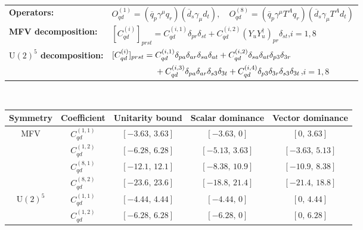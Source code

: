 \begin{table}[tbp]
\centering
{\small
\begin{tabular}{ll}
    \textbf{Operators:} &
        $\boxed{O_{qd}^{(1)} = (\overline q_p \gamma^\mu q_r)(\overline d_s \gamma_\mu d_t),\quad O_{qd}^{(8)} = (\overline q_p \gamma^\mu T^A q_r)(\overline d_s \gamma_\mu T^A d_t)}$ \\[0.2cm]
    \textbf{MFV decomposition:} &
        $[C_{qd}^{(i)}]_{prst} =
            C_{qd}^{(i,1)}\delta_{pr}\delta_{st}
            + C_{qd}^{(i,2)}(Y_u Y_u^\dagger)_{pr}\delta_{st}$,\quad $i=1,8$ \\[0.15cm]
    \textbf{$\mathrm{U}(2)^5$ decomposition:} &
        $[C_{qd}^{(i)}]_{prst} =
            C_{qd}^{(i,1)}\Pij{p}{r}{a}\Pij{s}{t}{a}
            + C_{qd}^{(i,2)}\Pij{s}{t}{a}\delta_{p3}\delta_{3r}$ \\
        & $\phantom{[C_{qd}^{(i)}]_{prst} ={}}+ C_{qd}^{(i,3)}\Pij{p}{r}{a}\delta_{s3}\delta_{3t}
            + C_{qd}^{(i,4)}\delta_{p3}\delta_{3r}\delta_{s3}\delta_{3t}$,\quad $i=1,8$ \\
\end{tabular}
\\[0.3cm]
\renewcommand{\arraystretch}{1.3}
\begin{tabular}{ccccc}
    \toprule
    \rowcolor{hdrcolor}
    \textbf{Symmetry} & \textbf{Coefficient}
        & \textbf{Unitarity bound}
        & \textbf{Scalar dominance}
        & \textbf{Vector dominance} \\
    \midrule
    \multirow{4}{*}{MFV}
        & $C_{qd}^{(1,1)}$ & $[-3.63,\, 3.63]$ & $[-3.63,\, 0]$     & $[0,\, 3.63]$     \\
        & $C_{qd}^{(1,2)}$ & $[-6.28,\, 6.28]$ & $[-5.13,\, 3.63]$  & $[-3.63,\, 5.13]$ \\
        & $C_{qd}^{(8,1)}$ & $[-12.1,\, 12.1]$ & $[-8.38,\, 10.9]$  & $[-10.9,\, 8.38]$ \\
        & $C_{qd}^{(8,2)}$ & $[-23.6,\, 23.6]$ & $[-18.8,\, 21.4]$  & $[-21.4,\, 18.8]$ \\
    \midrule
    \multirow{8}{*}{$\mathrm{U}(2)^5$}
        & $C_{qd}^{(1,1)}$ & $[-4.44,\, 4.44]$ & $[-4.44,\, 0]$    & $[0,\, 4.44]$    \\
        & $C_{qd}^{(1,2)}$ & $[-6.28,\, 6.28]$ & $[-6.28,\, 0]$    & $[0,\, 6.28]$    \\

\end{tabular}}
\end{table}
